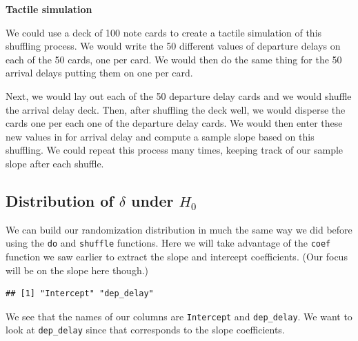 \documentclass[]{tufte-book}
\newenvironment{Shaded}{\begin{snugshade}}{\end{snugshade}}
\newcommand{\KeywordTok}[1]{\textcolor[rgb]{0.13,0.29,0.53}{\textbf{{#1}}}}
\newcommand{\DataTypeTok}[1]{\textcolor[rgb]{0.13,0.29,0.53}{{#1}}}
\newcommand{\DecValTok}[1]{\textcolor[rgb]{0.00,0.00,0.81}{{#1}}}
\newcommand{\StringTok}[1]{\textcolor[rgb]{0.31,0.60,0.02}{{#1}}}
\newcommand{\NormalTok}[1]{{#1}}
\begin{document}
\textbf{Tactile simulation}

We could use a deck of 100 note cards to create a tactile simulation of
this shuffling process. We would write the 50 different values of
departure delays on each of the 50 cards, one per card. We would then do
the same thing for the 50 arrival delays putting them on one per card.

Next, we would lay out each of the 50 departure delay cards and we would
shuffle the arrival delay deck. Then, after shuffling the deck well, we
would disperse the cards one per each one of the departure delay cards.
We would then enter these new values in for arrival delay and compute a
sample slope based on this shuffling. We could repeat this process many
times, keeping track of our sample slope after each shuffle.

\subsection{\texorpdfstring{Distribution of \(\delta\) under
\(H_0\)}{Distribution of \textbackslash{}delta under H\_0}}\label{distribution-of-delta-under-h_0-2}

We can build our randomization distribution in much the same way we did
before using the \texttt{do} and \texttt{shuffle} functions. Here we
will take advantage of the \texttt{coef} function we saw earlier to
extract the slope and intercept coefficients. (Our focus will be on the
slope here though.)

\begin{Shaded}
\end{Shaded}

\begin{verbatim}
## [1] "Intercept" "dep_delay"
\end{verbatim}

We see that the names of our columns are \texttt{Intercept} and
\texttt{dep\_delay}. We want to look at \texttt{dep\_delay} since that
corresponds to the slope coefficients.
\end{document}
